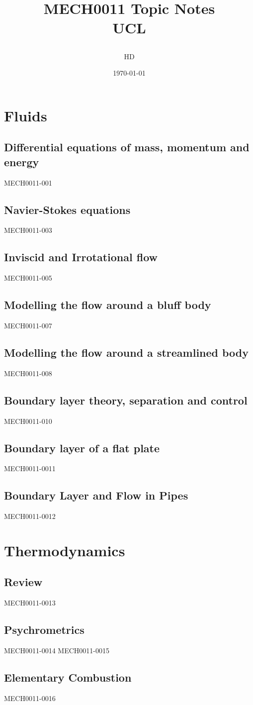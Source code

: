 \documentclass[12pt,a4paper, twoside]{report}
\begin{document}
\title{
  {MECH0011 Topic Notes}\\
  {\large UCL}
  \author{HD}
  \date{\today}
}
\maketitle
\tableofcontents
\part{Fluids}
\chapter{Differential equations of mass, momentum and energy}
{MECH0011-001}
\chapter{Navier-Stokes equations}
{MECH0011-003}
\chapter{Inviscid and Irrotational flow}
{MECH0011-005}
\chapter{Modelling the flow around a bluff body}
{MECH0011-007}
\chapter{Modelling the flow around a streamlined body}
{MECH0011-008}
\chapter{Boundary layer theory, separation and control}
{MECH0011-010}
\chapter{Boundary layer of a flat plate}
{MECH0011-0011}
\chapter{Boundary Layer and Flow in Pipes}
{MECH0011-0012}
\part{Thermodynamics}
\chapter{Review}
{MECH0011-0013}
\chapter{Psychrometrics}
{MECH0011-0014}
{MECH0011-0015}
\chapter{Elementary Combustion}
{MECH0011-0016}
\end{document}
